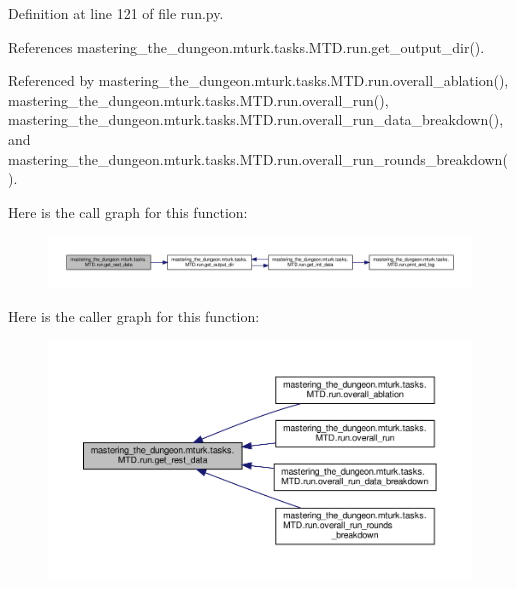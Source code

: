 Definition at line 121 of file run.\+py.



References mastering\+\_\+the\+\_\+dungeon.\+mturk.\+tasks.\+M\+T\+D.\+run.\+get\+\_\+output\+\_\+dir().



Referenced by mastering\+\_\+the\+\_\+dungeon.\+mturk.\+tasks.\+M\+T\+D.\+run.\+overall\+\_\+ablation(), mastering\+\_\+the\+\_\+dungeon.\+mturk.\+tasks.\+M\+T\+D.\+run.\+overall\+\_\+run(), mastering\+\_\+the\+\_\+dungeon.\+mturk.\+tasks.\+M\+T\+D.\+run.\+overall\+\_\+run\+\_\+data\+\_\+breakdown(), and mastering\+\_\+the\+\_\+dungeon.\+mturk.\+tasks.\+M\+T\+D.\+run.\+overall\+\_\+run\+\_\+rounds\+\_\+breakdown().

Here is the call graph for this function\+:
\nopagebreak
\begin{figure}[H]
\begin{center}
\leavevmode
\includegraphics[width=350pt]{namespacemastering__the__dungeon_1_1mturk_1_1tasks_1_1MTD_1_1run_a7d8855ab1a7622d4b811085a733b8483_cgraph}
\end{center}
\end{figure}
Here is the caller graph for this function\+:
\nopagebreak
\begin{figure}[H]
\begin{center}
\leavevmode
\includegraphics[width=350pt]{namespacemastering__the__dungeon_1_1mturk_1_1tasks_1_1MTD_1_1run_a7d8855ab1a7622d4b811085a733b8483_icgraph}
\end{center}
\end{figure}
\mbox{\label{namespacemastering__the__dungeon_1_1mturk_1_1tasks_1_1MTD_1_1run_a1925a7306fdbea58efedb85cb2ab2145}} 
